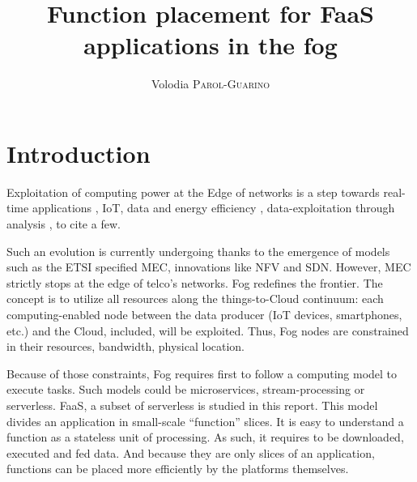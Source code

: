 \documentclass[11pt]{sdm}
\title{Function placement for FaaS applications in the fog}
\author{Volodia \textsc{Parol-Guarino}}
\begin{document}
\listoftodos[Notes]

\newpage

\maketitle



\section{Introduction}

Exploitation of computing power at the Edge of networks is a step towards real-time applications \cite{rausch_towards_2021,lin_cloudfog_2017}, \gls{IoT}, data and energy efficiency \cite{ieee_standards_association_smart_2018}, data-exploitation through analysis \cite{openfog_consortium_real-time_2018}, to cite a few.

Such an evolution is currently undergoing thanks to the emergence of models such as the \gls{ETSI} specified \gls{MEC}, innovations like \gls{NFV} and \gls{SDN}. However, \gls{MEC} strictly stops at the edge of telco's networks. Fog redefines the frontier. The concept is to utilize all resources along the things-to-Cloud continuum: each computing-enabled node between the data producer (\gls{IoT} devices, smartphones, etc.) and the Cloud, included, will be exploited. Thus, Fog nodes are constrained in their resources, bandwidth, physical location.

Because of those constraints, Fog requires first to follow a computing model to execute tasks. Such models could be microservices, stream-processing or serverless. \gls{FaaS}, a subset of serverless is studied in this report. This model divides an application in small-scale ``function'' slices. It is easy to understand a function as a stateless unit of processing. As such, it requires to be downloaded, executed and fed data. And because they are only slices of an application, functions can be placed more efficiently by the platforms themselves.
\end{document}
